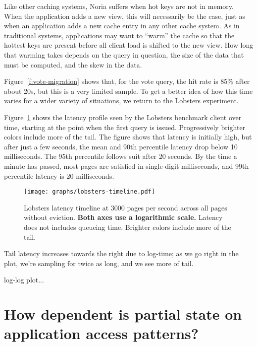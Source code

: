 Like other caching systems, Noria suffers when hot keys are not in memory. When
the application adds a new view, this will necessarily be the case, just as when
an application adds a new cache entry in any other cache system. As in
traditional systems, applications may want to ``warm'' the cache so that the
hottest keys are present before all client load is shifted to the new view. How
long that warming takes depends on the query in question, the size of the data
that must be computed, and the skew in the data.

Figure~\ref{f:vote-migration} shows that, for the vote query, the hit rate is
85\% after about 20s, but this is a very limited sample. To get a better idea of
how this time varies for a wider variety of situations, we return to the
Lobsters experiment.

Figure~\ref{f:lobsters-timeline} shows the latency profile seen by the Lobsters
benchmark client over time, starting at the point when the first query is
issued. Progressively brighter colors include more of the tail. The figure
shows that latency is initially high, but after just a few seconds, the mean and
90th percentile latency drop below 10 milliseconds. The 95th percentile follows
suit after 20 seconds. By the time a minute has passed, most pages are satisfied
in single-digit milliseconds, and 99th percentile latency is 20 milliseconds.

\begin{figure}[t]
  \centering
  \texttt{[image: graphs/lobsters-timeline.pdf]}
  \caption{Lobsters latency timeline at 3000 pages per second across all pages
  without eviction. \textbf{Both axes use a logarithmic scale.} Latency does not
  includes queueing time. Brighter colors include more of the tail.}
  \label{f:lobsters-timeline}
\end{figure}

\begin{inprogress}
  Tail latency increases towards the right due to log-time; as we go right in
  the plot, we're sampling for twice as long, and we see more of tail.
\end{inprogress}

\begin{inprogress}
  log-log plot...
\end{inprogress}

\section{How dependent is partial state on application access patterns?}
\label{s:eval:patterns}

